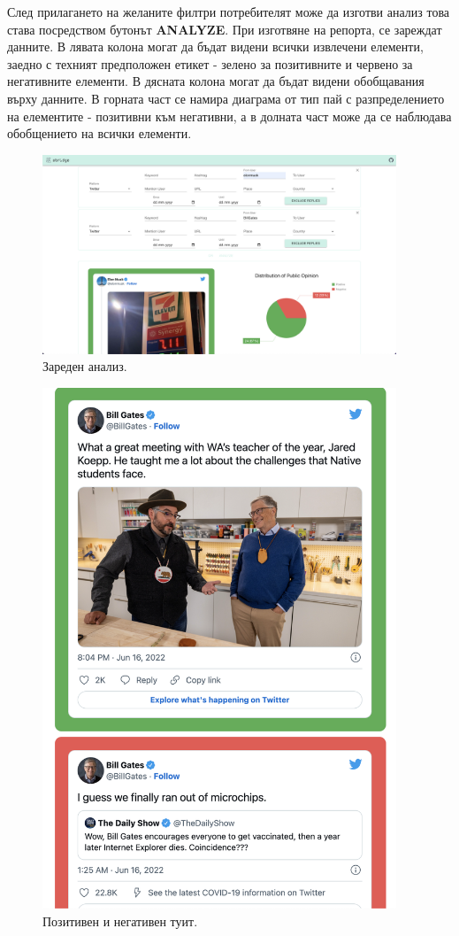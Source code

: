 \documentclass{article}
\begin{document}
След прилагането на желаните филтри потребителят може да изготви анализ това става посредством бутонът \textbf{ANALYZE}.
При изготвяне на репорта, се зареждат данните. В лявата колона могат да бъдат видени всички извлечени елементи, заедно
с техният предположен етикет - зелено за позитивните и червено за негативните елементи. В дясната колона могат да бъдат
видени обобщавания върху данните. В горната част се намира диаграма от тип пай с разпределението на елементите -
позитивни към негативни, а в долната част може да се наблюдава обобщението на всички елементи.

\begin{figure}[H]
\centering
\captionsetup{justification=centering}
\includegraphics[width=400px, keepaspectratio]{chapter-07/analysis.png}
\caption{Зареден анализ.}
\end{figure}

\begin{figure}[H]
\centering
\captionsetup{justification=centering}
\includegraphics[width=400px, keepaspectratio]{chapter-07/positive-negative.png}
\caption{Позитивен и негативен туит.}
\end{figure}
\end{document}
